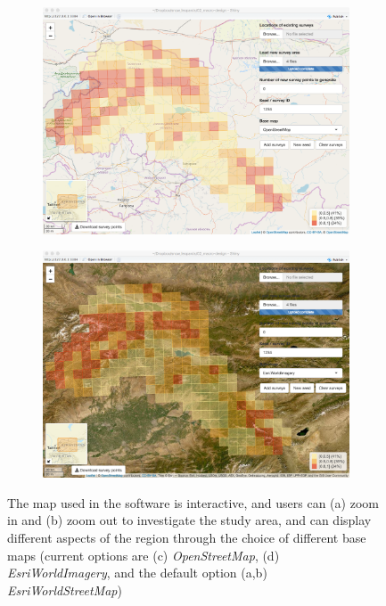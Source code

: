 \documentclass[a4paper,11pt]{article} %
\begin{document}
\begin{figure}[htbp]
\begin{subfigure}[b]{0.49\textwidth}
    \caption{}
  \end{subfigure} \\
    \begin{subfigure}[b]{0.49\textwidth}
    \includegraphics[width=\textwidth]{mac-4}
    \caption{}
  \end{subfigure}
  \begin{subfigure}[b]{0.49\textwidth}
    \includegraphics[width=\textwidth]{mac-5}
    \caption{}
  \end{subfigure}
\caption{The map used in the software is interactive, and users can (a) zoom in and (b) zoom out to investigate the study area, and can display different aspects of the region through the choice of different base maps (current options are (c) \textit{OpenStreetMap}, (d) \textit{EsriWorldImagery}, and the default option (a,b) \textit{EsriWorldStreetMap})}
\label{mac-2345}
\end{figure}
\end{document}
